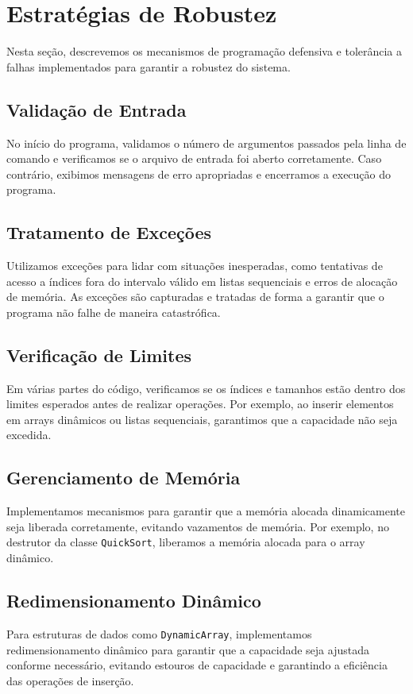 \documentclass[a4paper,12pt]{article}
\begin{document}
\section{Estratégias de Robustez}\hspace*{1cm}
Nesta seção, descrevemos os mecanismos de programação defensiva e tolerância a falhas implementados para garantir a robustez do sistema.

\subsection{Validação de Entrada}
No início do programa, validamos o número de argumentos passados pela linha de comando e verificamos se o arquivo de entrada foi aberto corretamente. Caso contrário, exibimos mensagens de erro apropriadas e encerramos a execução do programa.

\subsection{Tratamento de Exceções}
Utilizamos exceções para lidar com situações inesperadas, como tentativas de acesso a índices fora do intervalo válido em listas sequenciais e erros de alocação de memória. As exceções são capturadas e tratadas de forma a garantir que o programa não falhe de maneira catastrófica.

\subsection{Verificação de Limites}
Em várias partes do código, verificamos se os índices e tamanhos estão dentro dos limites esperados antes de realizar operações. Por exemplo, ao inserir elementos em arrays dinâmicos ou listas sequenciais, garantimos que a capacidade não seja excedida.

\subsection{Gerenciamento de Memória}
Implementamos mecanismos para garantir que a memória alocada dinamicamente seja liberada corretamente, evitando vazamentos de memória. Por exemplo, no destrutor da classe \texttt{QuickSort}, liberamos a memória alocada para o array dinâmico.

\subsection{Redimensionamento Dinâmico}
Para estruturas de dados como \texttt{DynamicArray}, implementamos redimensionamento dinâmico para garantir que a capacidade seja ajustada conforme necessário, evitando estouros de capacidade e garantindo a eficiência das operações de inserção.
\end{document}
